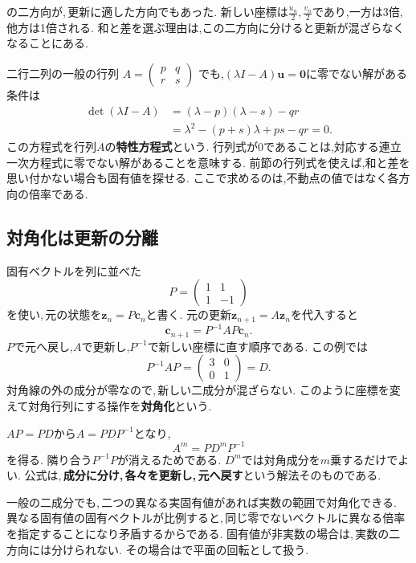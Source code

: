 の二方向が,\,更新に適した方向でもあった.
新しい座標は$\frac{u_n}{2},\frac{v_n}{2}$であり,一方は3倍,他方は1倍される.
和と差を選ぶ理由は,この二方向に分けると更新が混ざらなくなることにある.

二行二列の一般の行列
$A=\begin{pmatrix}p&q\\r&s\end{pmatrix}$
でも,$(\lambda I-A)\boldsymbol u=\boldsymbol0$に零でない解がある条件は
\[
 \begin{aligned}
 \det(\lambda I-A)
 &=(\lambda-p)(\lambda-s)-qr\\
 &=\lambda^2-(p+s)\lambda+ps-qr=0.
 \end{aligned}
\]
この方程式を行列$A$の\textbf{特性方程式}という.
行列式が0であることは,対応する連立一次方程式に零でない解があることを意味する.
前節の行列式を使えば,和と差を思い付かない場合も固有値を探せる.
ここで求めるのは,不動点の値ではなく各方向の倍率である.


\subsection{対角化は更新の分離}\label{節：対角化は更新の分離}

固有ベクトルを列に並べた
\[
 P=\begin{pmatrix}1&1\\1&-1\end{pmatrix}
\]
を使い,\,元の状態を$\boldsymbol z_n=P\boldsymbol c_n$と書く.
元の更新$\boldsymbol z_{n+1}=A\boldsymbol z_n$を代入すると
\[
 \boldsymbol c_{n+1}=P^{-1}AP\boldsymbol c_n.
\]
$P$で元へ戻し,$A$で更新し,$P^{-1}$で新しい座標に直す順序である.
この例では
\[
 P^{-1}AP=\begin{pmatrix}3&0\\0&1\end{pmatrix}=D.
\]
対角線の外の成分が零なので,\,新しい二成分が混ざらない.
このように座標を変えて対角行列にする操作を\textbf{対角化}という.

$AP=PD$から$A=PDP^{-1}$となり,
\[
 A^m=PD^mP^{-1}
\]
を得る. 隣り合う$P^{-1}P$が消えるためである.
$D^m$では対角成分を$m$乗するだけでよい.
公式は,\,\textbf{成分に分け,\,各々を更新し,\,元へ戻す}という解法そのものである.

一般の二成分でも,\,二つの異なる実固有値があれば実数の範囲で対角化できる.
異なる固有値の固有ベクトルが比例すると,\,同じ零でないベクトルに異なる倍率を指定することになり矛盾するからである.
固有値が非実数の場合は,\,実数の二方向には分けられない.
その場合はで平面の回転として扱う.

